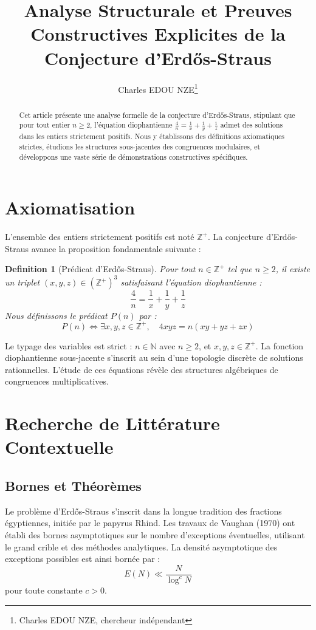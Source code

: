 \documentclass[11pt,a4paper]{article}
\title{Analyse Structurale et Preuves Constructives Explicites de la Conjecture d'Erd\H{o}s-Straus}
\author{Charles EDOU NZE\thanks{Charles EDOU NZE, chercheur indépendant}}
\date{}
\newtheorem{definition}[theorem]{Definition}
\begin{document}
\maketitle

\begin{abstract}
Cet article présente une analyse formelle de la conjecture d'Erd\H{o}s-Straus, stipulant que pour tout entier $n \geq 2$, l'équation diophantienne $\frac{4}{n} = \frac{1}{x} + \frac{1}{y} + \frac{1}{z}$ admet des solutions dans les entiers strictement positifs. Nous y établissons des définitions axiomatiques strictes, étudions les structures sous-jacentes des congruences modulaires, et développons une vaste série de démonstrations constructives spécifiques.
\end{abstract}

\tableofcontents


\section{Axiomatisation}

L'ensemble des entiers strictement positifs est noté $\mathbb{Z}^{+}$. La conjecture d'Erd\H{o}s-Straus avance la proposition fondamentale suivante :

\begin{definition}[Prédicat d'Erd\H{o}s-Straus]
Pour tout $n \in \mathbb{Z}^{+}$ tel que $n \geq 2$, il existe un triplet $(x, y, z) \in (\mathbb{Z}^{+})^3$ satisfaisant l'équation diophantienne :
\begin{equation}
\frac{4}{n} = \frac{1}{x} + \frac{1}{y} + \frac{1}{z}
\label{eq:erdos}
\end{equation}
Nous définissons le prédicat $P(n)$ par :
$$ P(n) \iff \exists x, y, z \in \mathbb{Z}^{+}, \quad 4xyz = n(xy + yz + zx) $$
\end{definition}

Le typage des variables est strict : $n \in \mathbb{N}$ avec $n \geq 2$, et $x, y, z \in \mathbb{Z}^{+}$. La fonction diophantienne sous-jacente s'inscrit au sein d'une topologie discrète de solutions rationnelles. L'étude de ces équations révèle des structures algébriques de congruences multiplicatives.

\section{Recherche de Littérature Contextuelle}

\subsection{Bornes et Théorèmes}
Le problème d'Erd\H{o}s-Straus s'inscrit dans la longue tradition des fractions égyptiennes, initiée par le papyrus Rhind. Les travaux de Vaughan (1970) ont établi des bornes asymptotiques sur le nombre d'exceptions éventuelles, utilisant le grand crible et des méthodes analytiques. La densité asymptotique des exceptions possibles est ainsi bornée par :
$$ E(N) \ll \frac{N}{\log^c N} $$
pour toute constante $c > 0$.
\end{document}
